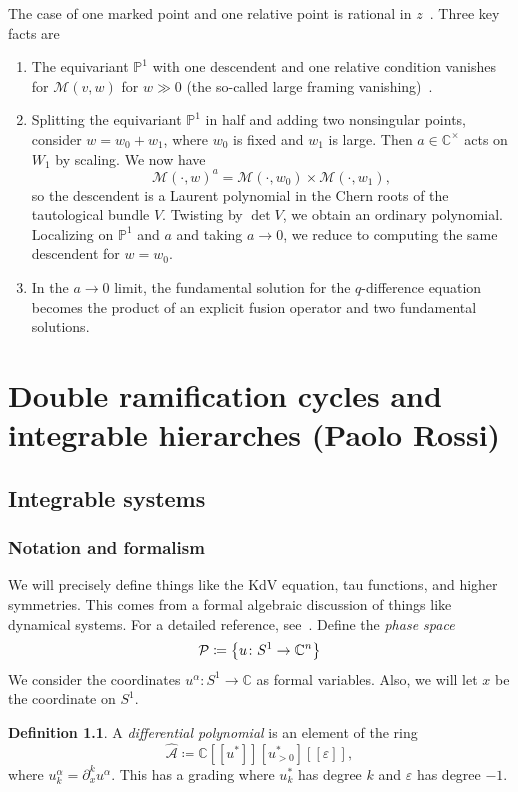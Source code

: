 \documentclass[leqno, openany]{memoir}
\theoremstyle{definition}
\newtheorem{defn}[thm]{Definition}
\theoremstyle{remark}
\theoremstyle{plain}
\theoremstyle{definition}
\theoremstyle{remark}
\newcommand{\C}{\mathbb{C}}
\renewcommand{\P}{\mathbb{P}}
\newcommand{\ep}{\varepsilon}
\newcommand{\mc}[1]{\mathcal{#1}}
\newcommand{\wh}[1]{\widehat{#1}}
\begin{document}
The case of one marked point and one relative point is rational in $z$~\cite{ratcapdescvertex}. Three key facts are
\begin{enumerate}
    \item The equivariant $\P^1$ with one descendent and one relative condition vanishes for $\mc{M}(v, w)$ for $w \gg 0$ (the so-called large framing vanishing)~\cite{pcmi}.
    \item Splitting the equivariant $\P^1$ in half and adding two nonsingular points, consider $w = w_0 + w_1$, where $w_0$ is fixed and $w_1$ is large. Then $a \in \C^{\times}$ acts on $W_1$ by scaling. We now have
        \[ \mc{M}(\cdot, w)^a = \mc{M}(\cdot, w_0) \times \mc{M}(\cdot, w_1), \]
        so the descendent is a Laurent polynomial in the Chern roots of the tautological bundle $V$. Twisting by $\det V$, we obtain an ordinary polynomial. Localizing on $\P^1$ and $a$ and taking $a \to 0$, we reduce to computing the same descendent for $w = w_0$.
    \item In the $a \to 0$ limit, the fundamental solution for the $q$-difference equation becomes the product of an explicit fusion operator and two fundamental solutions.
\end{enumerate}

\chapter{Double ramification cycles and integrable hierarches (Paolo Rossi)}%

\section{Integrable systems}

\subsection{Notation and formalism}

We will precisely define things like the KdV equation, tau functions, and higher symmetries. This comes from a formal algebraic discussion of things like dynamical systems. For a detailed reference, see~\cite{dubzhang}. Define the \textit{phase space}
\[ \mc{P} \coloneqq \qty{u \colon S^1 \to \C^n} \]
We consider the coordinates $u^{\alpha} \colon S^1 \to \C$ as formal variables. Also, we will let $x$ be the coordinate on $S^1$.

\begin{defn}
    A \textit{differential polynomial} is an element of the ring
    \[ \wh{\mc{A}} \coloneqq \C[[u^*]][u_{>0}^*][[\ep]], \]
    where $u_k^{\alpha} = \partial_x^k u^{\alpha}$. This has a grading where $u_k^*$ has degree $k$ and $\ep$ has degree $-1$.
\end{defn}
\end{document}
